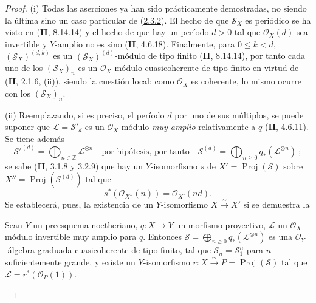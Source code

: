 \begin{proof}
(i) Todas las aserciones ya han sido prácticamente demostradas, no siendo la última sino un caso particular de (\hyperref[III.2.3.2-fr]{2.3.2}). El hecho de que $\mathcal S_X$ es periódico se ha visto en (\textbf{II}, 8.14.14) y el hecho de que hay un período $d>0$ tal que $\mathcal O_X(d)$ sea invertible y $Y$-amplio no es sino (\textbf{II}, 4.6.18). Finalmente, para $0\leq k<d$, $(\mathcal S_X)^{(d,k)}$ es un $(\mathcal S_X)^{(d)}$-módulo de tipo finito (\textbf{II}, 8.14.14), por tanto cada uno de los $(\mathcal S_X)_n$ es un $\mathcal O_X$-módulo cuasicoherente de tipo finito en virtud de (\textbf{II}, 2.1.6, (ii)), siendo la cuestión local; como $\mathcal O_X$ es coherente, lo mismo ocurre con los $(\mathcal S_X)_n$.

(ii) Reemplazando, si es preciso, el período $d$ por uno de sus múltiplos, se puede suponer que $\mathcal L=\mathcal S'_d$ es un $\mathcal O_X$-módulo \emph{muy amplio} relativamente a $q$ (\textbf{II}, 4.6.11). Se tiene además
\[
\mathcal S'^{(d)}=\bigoplus_{n\in\mathbb Z}\mathcal L^{\otimes n}
\quad\text{por hipótesis, por tanto}\quad
\mathcal S^{(d)}=\bigoplus_{n\geq0}q_*(\mathcal L^{\otimes n})~;
\]
se sabe (\textbf{II}, 3.1.8 y 3.2.9) que hay un $Y$-isomorfismo $s$ de $X'=\operatorname{Proj}(\mathcal S)$ sobre $X''=\operatorname{Proj}(\mathcal S^{(d)})$ tal que
\[
s^*(\mathcal O_{X''}(n))=\mathcal O_{X'}(nd).
\]
Se establecerá, pues, la existencia de un $Y$-isomorfismo $X\xrightarrow{\sim}X'$ si se demuestra la

\begin{proposition}[2.3.4.1]
\label{III.2.3.4.1-fr}
Sean $Y$ un preesquema noetheriano, $q:X\to Y$ un morfismo proyectivo, $\mathcal L$ un $\mathcal O_X$-módulo invertible muy amplio para $q$. Entonces $\mathcal S=\bigoplus_{n\geq0}q_*(\mathcal L^{\otimes n})$ es una $\mathcal O_Y$-álgebra graduada cuasicoherente de tipo finito, tal que $\mathcal S_n=\mathcal S_1^n$ para $n$ suficientemente grande, y existe un $Y$-isomorfismo $r:X\xrightarrow{\sim}P=\operatorname{Proj}(\mathcal S)$ tal que $\mathcal L=r^*(\mathcal O_P(1))$.
\end{proposition}


\end{proof}
